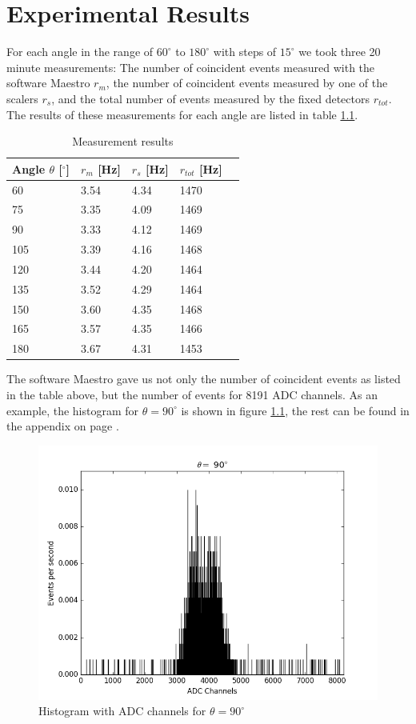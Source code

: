 \documentclass[a4paper,parskip,11pt, DIV12]{scrreprt}
\begin{document}
\chapter{Experimental Results}
For each angle in the range of $60^{\circ}$ to $180^{\circ}$ with steps of $15^{\circ}$ we took three 20 minute measurements: The number of coincident events measured with the software Maestro $r_m$, the number of coincident events measured by one of the scalers $r_s$, and the total number of events measured by the fixed detectors $r_{tot}$. The results of these measurements for each angle are listed in table \ref{tab:measurement}. 
%
\begin{table}[H]\label{tab:measurement}
\begin{center}
\begin{tabular}{lllll}
Angle $\theta$ [$^{\circ}$] & $r_{m}$ [Hz] & $r_{s}$ [Hz] & $r_{tot}$ [Hz]\\
\hline
60 	& 3.54 & 4.34 & 1470\\
75 	& 3.35 & 4.09 & 1469\\
90 	& 3.33 & 4.12 & 1469\\
105 	& 3.39 & 4.16 & 1468\\
120	& 3.44 & 4.20 & 1464\\
135	& 3.52 & 4.29 & 1464\\
150	& 3.60 & 4.35 & 1468\\
165	& 3.57 & 4.35 & 1466\\
180	& 3.67 & 4.31 & 1453\\ 
\end{tabular}
\caption{Measurement results}
\label{tab:measurement}
\end{center}
\end{table}
%
The software Maestro gave us not only the number of coincident events as listed in the table above, but the number of events for 8191 ADC channels. As an example, the histogram for $\theta = 90^{\circ}$ is shown in figure \ref{fig:histogramraw}, the rest can be found in the appendix on page \pageref{app:histogramraw}.
%
\begin{figure}[H]
\centering
\includegraphics[scale=0.65]{90degraw.png}
\caption[Histogram]{Histogram with ADC channels for $\theta = 90^{\circ}$}
\label{fig:histogramraw}
\end{figure}
%
\end{document}
